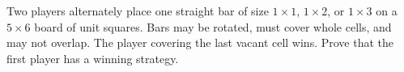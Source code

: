 Two players alternately place one straight bar of size $1\times1$, $1\times2$, or $1\times3$ on a $5\times6$ board of unit squares. Bars may be rotated, must cover whole cells, and may not overlap. The player covering the last vacant cell wins. Prove that the first player has a winning strategy.
